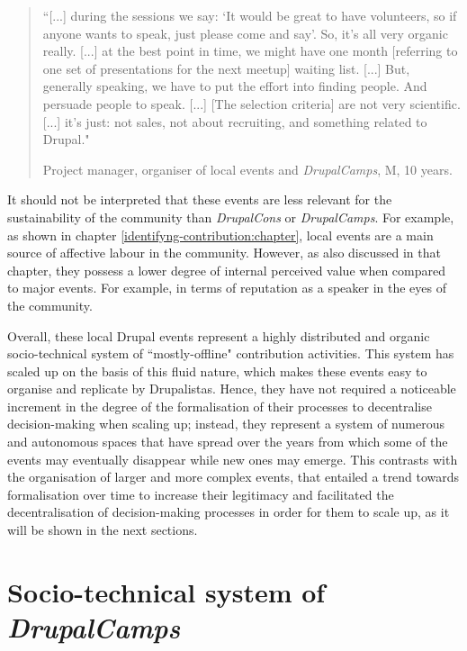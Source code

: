 \begin{quotation}
``[...] during the sessions we say: `It would be great to have volunteers, so if anyone wants to speak, just please come and say'. So, it's all very organic really. [...] at the best point in time, we might have one month [referring to one set of presentations for the next meetup] waiting list. [...] But, generally speaking, we have to put the effort into finding people. And persuade people to speak. [...] [The selection criteria] are not very scientific. [...] it's just: not sales, not about recruiting, and something related to Drupal."

\begin{flushright}\footnotesize{Project manager, organiser of local events and \textit{DrupalCamps}, M, 10 years.}\end{flushright}
\end{quotation}

It should not be interpreted that these events are less relevant for the sustainability of the community than \textit{DrupalCons} or \textit{DrupalCamps}. For example, as shown in chapter \ref{identifyng-contribution:chapter}, local events are a main source of affective labour in the community. However, as also discussed in that chapter, they possess a lower degree of internal perceived value when compared to major events. For example, in terms of reputation as a speaker in the eyes of the community.

Overall, these local Drupal events represent a highly distributed and organic socio-technical system of ``mostly-offline" contribution activities. This system has scaled up on the basis of this fluid nature, which makes these events easy to organise and replicate by Drupalistas. Hence, they have not required a noticeable increment in the degree of the formalisation of their processes to decentralise decision-making when scaling up; instead, they represent a system of numerous and autonomous spaces that have spread over the years from which some of the events may eventually disappear while new ones may emerge. This contrasts with the organisation of larger and more complex events, that entailed a trend towards formalisation over time to increase their legitimacy and facilitated the decentralisation of decision-making processes in order for them to scale up, as it will be shown in the next sections.

\section{Socio-technical system of \textit{DrupalCamps}}
\label{subsec:org-camps}

